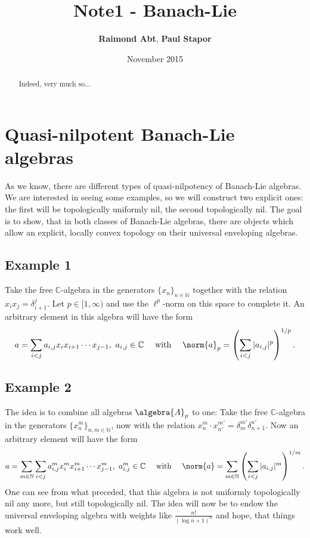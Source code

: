 \documentclass[
11pt,                          %
english                        %
]{article}
\title{Note1 - Banach-Lie}
\author{
  \textbf{Raimond Abt},
  \textbf{Paul Stapor}
  \\[0.5cm]
}
\date{November 2015}
\begin{document}
%

\maketitle

\begin{abstract}
    Indeed, very much so...
\end{abstract}

\tableofcontents

\newpage

\section{Quasi-nilpotent Banach-Lie algebras}

As we know, there are different types of quasi-nilpotency of Banach-Lie algebras.
We are interested in seeing some examples, so we will construct two explicit ones:
the first will be topologically uniformly nil, the second topologically nil.
The goal is to show, that in both classes of Banach-Lie algebras, there are objects
which allow an explicit, locally convex topology on their universal enveloping 
algebras.



\subsection{Example 1}

Take the free $\mathbb{C}$-algebra in the generators $\{x_n\}_{n \in \mathbb{N}}$ 
together with the relation $x_i x_j = \delta_{i+1}^j$. Let $p \in [1, \infty)$
and use the $\ell^p$-norm on this space to complete it. An arbitrary element in this algebra will have the form
\begin{equation*}
	a =
	\sum\limits_{i < j}
	a_{i, j} x_i x_{i + 1} \cdots x_{j - 1}
	, \
	a_{i,j} \in \mathbb{C}
	\quad \text{ with } \quad
	\norm{a}_p
	=
	\left(
		\sum\limits_{i < j}
		|a_{i, j}|^p
	\right)^{1/p}.
\end{equation*}



\subsection{Example 2}

The idea is to combine all algebras $\algebra{A}_p$ to one: Take the free  
$\mathbb{C}$-algebra in the generators $\{x_n^m\}_{n,m \in \mathbb{N}}$, now with 
the relation $x_n^m \cdot x_{n'}^{m'} = \delta_m^{m'} \delta_{n+1}^{n'}$. Now an 
arbitrary element will have the form
\begin{equation*}
	a =
	\sum\limits_{m \in \mathbb{N}}
	\sum\limits_{i < j}
	a_{i, j}^m x_i^m x_{i + 1}^m \cdots x_{j - 1}^m
	, \
	a_{i,j}^m \in \mathbb{C}
	\quad \text{ with } \quad
	\norm{a}
	=
	\sum\limits_{m \in \mathbb{N}}
	\left(
		\sum\limits_{i < j}
		|a_{i, j}|^m
	\right)^{1/m}.
\end{equation*}
One can see from what preceded, that this algebra is not uniformly topologically 
nil any more, but still topologically nil. The idea will now be to endow the 
universal enveloping algebra with weights like $\frac{n!}{(\log n + 1)^n}$ and 
hope, that things work well.
\end{document}
